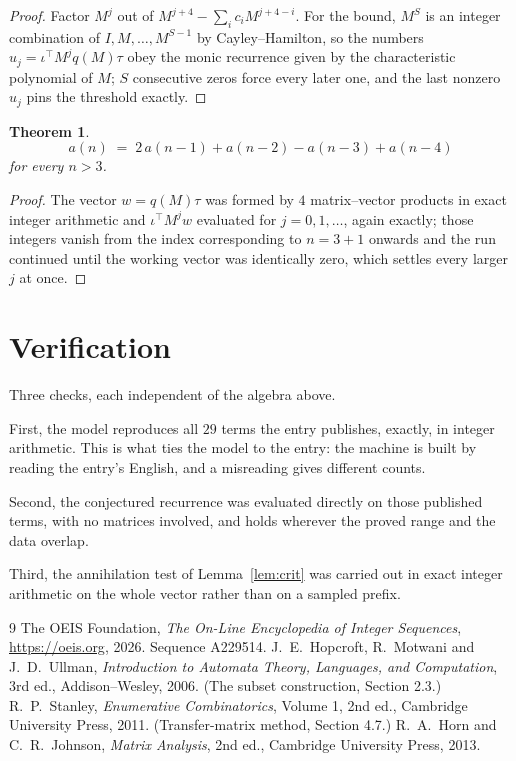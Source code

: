 \documentclass[11pt,a4paper]{article}
\theoremstyle{plain}
\newtheorem{theorem}{Theorem}
\theoremstyle{definition}
\begin{document}
\begin{proof}
Factor $M^{j}$ out of $M^{j+4}-\sum_ic_iM^{j+4-i}$. For the bound, $M^{S}$
is an integer combination of $I,M,\dots,M^{S-1}$ by Cayley--Hamilton, so the numbers
$u_j=\iota^{\!\top}M^{j}q(M)\tau$ obey the monic recurrence given by the characteristic
polynomial of $M$; $S$ consecutive zeros force every later one, and the last nonzero $u_j$
pins the threshold exactly.
\end{proof}

\begin{theorem}
\[
a(n)\;=\;2\,a(n-1) + a(n-2) - a(n-3) + a(n-4)
\]
for every $n>3$.
\end{theorem}

\begin{proof}
The vector $w=q(M)\tau$ was formed by $4$ matrix--vector products in exact integer
arithmetic and $\iota^{\!\top}M^{j}w$ evaluated for $j=0,1,\dots$, again exactly; those
integers vanish from the index corresponding to $n=3+1$ onwards and the run continued
until the working vector was identically zero, which settles every larger $j$ at once.
\end{proof}

\section{Verification}

Three checks, each independent of the algebra above.

First, the model reproduces all $29$ terms the entry publishes, exactly, in integer
arithmetic. This is what ties the model to the entry: the machine is built by reading the
entry's English, and a misreading gives different counts.

Second, the conjectured recurrence was evaluated directly on those published terms, with no
matrices involved, and holds wherever the proved range and the data overlap.

Third, the annihilation test of Lemma~\ref{lem:crit} was carried out in exact integer
arithmetic on the whole vector rather than on a sampled prefix.

\begin{thebibliography}{9}
 The OEIS Foundation, \emph{The On-Line Encyclopedia of Integer
Sequences}, \url{https://oeis.org}, 2026. Sequence A229514.
 J.~E.~Hopcroft, R.~Motwani and J.~D.~Ullman, \emph{Introduction to Automata
Theory, Languages, and Computation}, 3rd ed., Addison--Wesley, 2006. (The subset
construction, Section 2.3.)
 R.~P.~Stanley, \emph{Enumerative Combinatorics}, Volume 1, 2nd ed.,
Cambridge University Press, 2011. (Transfer-matrix method, Section 4.7.)
 R.~A.~Horn and C.~R.~Johnson, \emph{Matrix Analysis}, 2nd ed., Cambridge
University Press, 2013.
\end{thebibliography}
\end{document}
